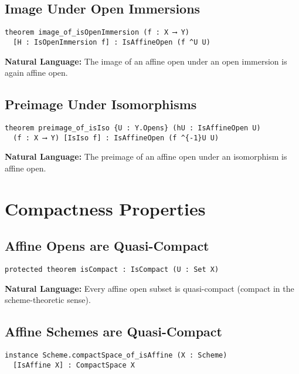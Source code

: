 \documentclass{article}
\theoremstyle{definition}
\begin{document}
\subsection{Image Under Open Immersions}

\begin{lstlisting}
theorem image_of_isOpenImmersion (f : X ⟶ Y)
  [H : IsOpenImmersion f] : IsAffineOpen (f ^U U)
\end{lstlisting}

\textbf{Natural Language:} The image of an affine open under an open immersion is again affine open.

\subsection{Preimage Under Isomorphisms}

\begin{lstlisting}
theorem preimage_of_isIso {U : Y.Opens} (hU : IsAffineOpen U)
  (f : X ⟶ Y) [IsIso f] : IsAffineOpen (f ^{-1}U U)
\end{lstlisting}

\textbf{Natural Language:} The preimage of an affine open under an isomorphism is affine open.

\section{Compactness Properties}

\subsection{Affine Opens are Quasi-Compact}

\begin{lstlisting}
protected theorem isCompact : IsCompact (U : Set X)
\end{lstlisting}

\textbf{Natural Language:} Every affine open subset is quasi-compact (compact in the scheme-theoretic sense).

\subsection{Affine Schemes are Quasi-Compact}

\begin{lstlisting}
instance Scheme.compactSpace_of_isAffine (X : Scheme)
  [IsAffine X] : CompactSpace X
\end{lstlisting}
\end{document}
